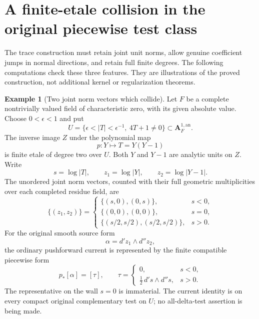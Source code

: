\documentclass[11pt,a4paper]{article}
\numberwithin{equation}{section}
\theoremstyle{definition}
\newtheorem{example}[theorem]{Example}
\theoremstyle{remark}
\begin{document}


\section{A finite-etale collision in the original piecewise test class}
\label{sec:r5-finite-etale-collision-check}

The trace construction must retain joint unit norms, allow genuine
coefficient jumps in normal directions, and retain full finite
degrees.  The following computations check these three features.
They are illustrations of the proved construction, not additional
kernel or regularization theorems.

\begin{example}[Two joint norm vectors which collide]
\label{ex:r5-finite-etale-joint-collision}
Let $F$ be a complete nontrivially valued field of characteristic
zero, with its given absolute value.  Choose $0<\epsilon<1$ and put
\[
 U=\{\epsilon<|T|<\epsilon^{-1},\ 4T+1\ne0\}
          \subset\mathbf A_F^{1,\mathrm{an}}.
\]
The inverse image $Z$ under the polynomial map
\[
                    p:Y\longmapsto T=Y(Y-1)
\]
is finite etale of degree two over $U$.  Both $Y$ and $Y-1$
are analytic units on $Z$.  Write
\[
 s=\log|T|,\qquad z_1=\log|Y|,\qquad z_2=\log|Y-1|.
\]
The unordered joint norm vectors, counted with their full geometric
multiplicities over each completed residue field, are
\begin{equation}
 \{(z_1,z_2)\}
 =
 \begin{cases}
   \{(s,0),(0,s)\},&s<0,\\
   \{(0,0),(0,0)\},&s=0,\\
   \{(s/2,s/2),(s/2,s/2)\},&s>0.
 \end{cases}
 \label{eq:r5-joint-collision-vectors}
\end{equation}
For the original smooth source form
\[
                    \alpha=d'z_1\wedge d''z_2,
\]
the ordinary pushforward current is represented by the finite
compatible piecewise form
\begin{equation}
 p_*[\alpha]=[\tau],\qquad
 \tau=
 \begin{cases}
  0,&s<0,\\[2pt]
  \tfrac12\,d's\wedge d''s,&s>0.
 \end{cases}
 \label{eq:r5-joint-collision-trace}
\end{equation}
The representative on the wall $s=0$ is immaterial.  The current
identity is on every compact original complementary test on $U$;
no all-delta-test assertion is being made.
\end{example}
\end{document}
